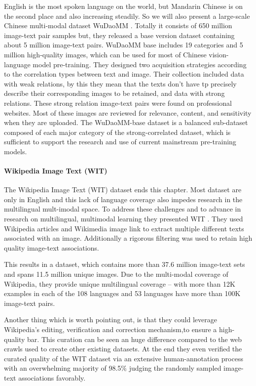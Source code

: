 \documentclass[
]{krantz}
\begin{document}
English is the most spoken language on the world, but Mandarin Chinese is on the second place and also increasing steadily. So we will also present a large-scale Chinese multi-modal dataset WuDaoMM \citep{yuan2022wudaomm}. Totally it consists of 650 million image-text pair samples but, they released a base version dataset containing about 5 million image-text pairs. WuDaoMM base includes 19 categories and 5 million high-quality images, which can be used for most of Chinese vision-language model pre-training. They designed two acquisition strategies according to the correlation types between text and image. Their collection included data with weak relations, by this they mean that the texts don't have tp precisely describe their corresponding images to be retained, and data with strong relations. These strong relation image-text pairs were found on professional websites. Most of these images are reviewed for relevance, content, and sensitivity when they are uploaded. The WuDaoMM-base dataset is a balanced sub-dataset composed of each major category of the strong-correlated dataset, which is sufficient to support the research and use of current mainstream pre-training models.

\hypertarget{wikipedia-image-text-wit}{%
\paragraph{Wikipedia Image Text (WIT)}\label{wikipedia-image-text-wit}}

The Wikipedia Image Text (WIT) dataset ends this chapter. Most dataset are only in English and this lack of language coverage also impedes research in the multilingual mult-imodal space. To address these challenges and to advance in research on multilingual, multimodal learning they presented WIT \citep{srinivasan2021wit}. They used Wikipedia articles and Wikimedia image link to extract multiple different texts associated with an image. Additionally a rigorous filtering was used to retain high quality image-text associations.

This results in a dataset, which contains more than 37.6 million image-text sets and spans 11.5 million unique images. Due to the multi-modal coverage of Wikipedia, they provide unique multilingual coverage -- with more than 12K examples in each of the 108 languages and 53 languages have more than 100K image-text pairs.

Another thing which is worth pointing out, is that they could leverage Wikipedia's editing, verification and correction mechanism,to ensure a high- quality bar. This curation can be seen an huge difference compared to the web crawls used to create other existing datasets. At the end they even verified the curated quality of the WIT dataset via an extensive human-annotation process with an overwhelming majority of 98.5\% judging the randomly sampled image-text associations favorably.
\end{document}
